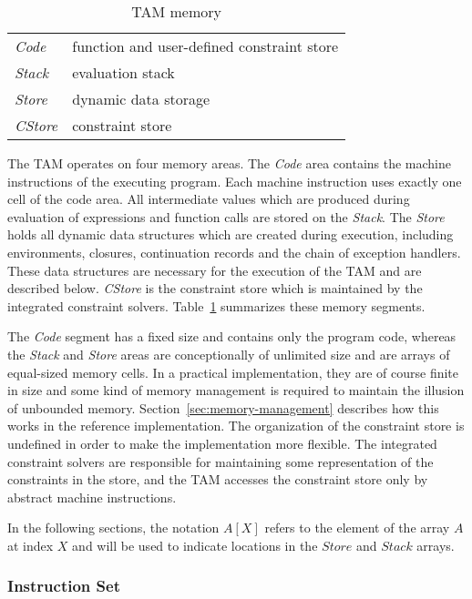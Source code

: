 \begin{table}
\begin{center}
\begin{tabular}{|ll|}
\hline
{\em Code} & function and user-defined constraint store\\
{\em Stack} & evaluation stack\\
{\em Store} & dynamic data storage\\
{\em CStore} & constraint store\\
\hline
\end{tabular}
\end{center}
\caption{TAM memory}
\label{tab:memory-model}
\end{table}

The TAM operates on four memory areas.  The {\em Code}\/ area contains
the machine instructions of the executing program.  Each machine
instruction uses exactly one cell of the code area. All intermediate
values which are produced during evaluation of expressions and
function calls are stored on the {\em Stack}.  The {\em Store} holds
all dynamic data structures which are created during execution,
including environments, closures, continuation records and the chain
of exception handlers.  These data structures are necessary for the
execution of the TAM and are described below.  {\em CStore} is the
constraint store which is maintained by the integrated constraint
solvers.  Table~\ref{tab:memory-model} summarizes these memory
segments.

The {\em Code} segment has a fixed size and contains only the program
code, whereas the {\em Stack} and {\em Store} areas are conceptionally
of unlimited size and are arrays of equal-sized memory cells.  In a
practical implementation, they are of course finite in size and some
kind of memory management is required to maintain the illusion of
unbounded memory.  Section~\ref{sec:memory-management} describes how
this works in the \turtle{} reference implementation.  The
organization of the constraint store is undefined in order to make the
implementation more flexible.  The integrated constraint solvers are
responsible for maintaining some representation of the constraints in
the store, and the TAM accesses the constraint store only by abstract
machine instructions.

In the following sections, the notation $A[X]$ refers to the element
of the array $A$ at index $X$ and will be used to indicate locations
in the $Store$ and $Stack$ arrays.

\subsubsection{Instruction Set}

